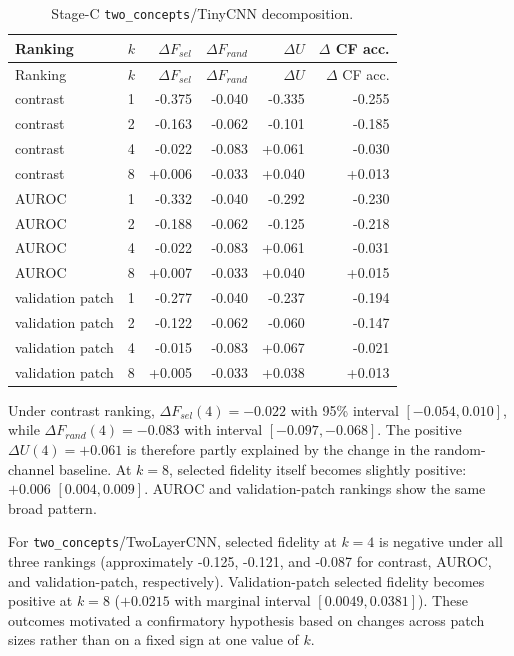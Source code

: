 {
\small
\setlength{\tabcolsep}{3pt}
\begin{longtable}{llrrrr}
\caption{Stage-C \texttt{two\_concepts}/TinyCNN decomposition.}\label{tab:stage-c-decomp}\\
\toprule
Ranking & $k$ & $\Delta F_{sel}$ & $\Delta F_{rand}$ & $\Delta U$ & $\Delta$ CF acc. \\
\midrule
\endfirsthead
\toprule
Ranking & $k$ & $\Delta F_{sel}$ & $\Delta F_{rand}$ & $\Delta U$ & $\Delta$ CF acc. \\
\midrule
\endhead
\bottomrule
\endfoot
contrast & 1 & -0.375 & -0.040 & -0.335 & -0.255 \\
contrast & 2 & -0.163 & -0.062 & -0.101 & -0.185 \\
contrast & 4 & -0.022 & -0.083 & +0.061 & -0.030 \\
contrast & 8 & +0.006 & -0.033 & +0.040 & +0.013 \\
AUROC & 1 & -0.332 & -0.040 & -0.292 & -0.230 \\
AUROC & 2 & -0.188 & -0.062 & -0.125 & -0.218 \\
AUROC & 4 & -0.022 & -0.083 & +0.061 & -0.031 \\
AUROC & 8 & +0.007 & -0.033 & +0.040 & +0.015 \\
validation patch & 1 & -0.277 & -0.040 & -0.237 & -0.194 \\
validation patch & 2 & -0.122 & -0.062 & -0.060 & -0.147 \\
validation patch & 4 & -0.015 & -0.083 & +0.067 & -0.021 \\
validation patch & 8 & +0.005 & -0.033 & +0.038 & +0.013 \\
\end{longtable}
\normalsize
}

Under contrast ranking, $\Delta F_{sel}(4)=-0.022$ with 95\% interval $[-0.054,0.010]$, while $\Delta F_{rand}(4)=-0.083$ with interval $[-0.097,-0.068]$. The positive $\Delta U(4)=+0.061$ is therefore partly explained by the change in the random-channel baseline. At $k=8$, selected fidelity itself becomes slightly positive: $+0.006$ $[0.004,0.009]$. AUROC and validation-patch rankings show the same broad pattern.

For \texttt{two\_concepts}/TwoLayerCNN, selected fidelity at $k=4$ is negative under all three rankings (approximately -0.125, -0.121, and -0.087 for contrast, AUROC, and validation-patch, respectively). Validation-patch selected fidelity becomes positive at $k=8$ ($+0.0215$ with marginal interval $[0.0049,0.0381]$). These outcomes motivated a confirmatory hypothesis based on changes across patch sizes rather than on a fixed sign at one value of $k$.

